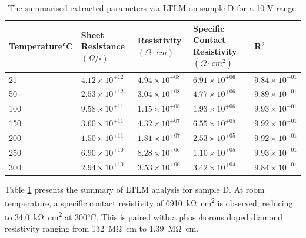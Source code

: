 \begin{refsection}
\begin{table}[h]
\caption{The summarised extracted parameters via LTLM on sample D for a 10 V range.}
\label{tab:d_ltlmss}
\centering
\begin{tabular}{lllll}
\toprule
Temperature\si{\degreeCelsius} & Sheet Resistance $(\Omega/\square)$ & Resistivity $(\Omega\cdot cm)$ & Specific Contact Resistivity $(\Omega\cdot cm^2)$ & R$^2$ \\
\midrule
21 & $4.12\times 10^{+12}$ & $4.94\times 10^{+08}$ & $6.91\times 10^{+06}$ & $9.84\times 10^{-01}$ \\
50 & $2.53\times 10^{+12}$ & $3.04\times 10^{+08}$ & $4.77\times 10^{+06}$ & $9.89\times 10^{-01}$ \\
100 & $9.58\times 10^{+11}$ & $1.15\times 10^{+08}$ & $1.93\times 10^{+06}$ & $9.93\times 10^{-01}$ \\
150 & $3.60\times 10^{+11}$ & $4.32\times 10^{+07}$ & $6.55\times 10^{+05}$ & $9.92\times 10^{-01}$ \\
200 & $1.50\times 10^{+11}$ & $1.81\times 10^{+07}$ & $2.53\times 10^{+05}$ & $9.92\times 10^{-01}$ \\
250 & $6.90\times 10^{+10}$ & $8.28\times 10^{+06}$ & $1.10\times 10^{+05}$ & $9.93\times 10^{-01}$ \\
300 & $2.94\times 10^{+10}$ & $3.53\times 10^{+06}$ & $3.42\times 10^{+04}$ & $9.84\times 10^{-01}$ \\
\bottomrule
\end{tabular}
\end{table}

Table \ref{tab:d_ltlmss} presents the summary of LTLM analysis for sample D. At room temperature, a specific contact resistivity of 6910~\si{\kilo\ohm\centi\metre\squared} is observed, reducing to 34.0~\si{\kilo\ohm\centi\metre\squared} at 300\si{\degreeCelsius}. This is paired with a phosphorous doped diamond resistivity ranging from 132~\si{\mega\ohm\centi\metre} to 1.39~\si{\mega\ohm\centi\metre}.


\end{refsection}
